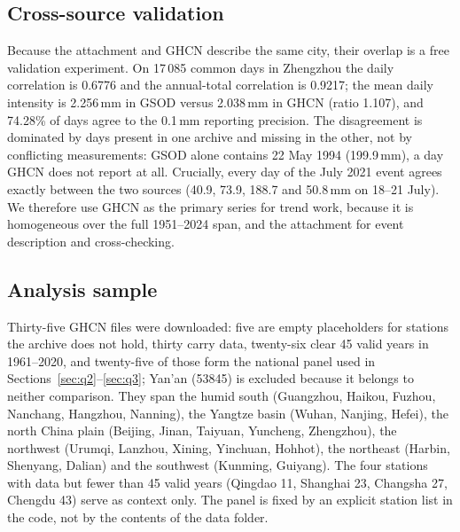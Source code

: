 \subsection{Cross-source validation}

Because the attachment and GHCN describe the same city, their overlap is a free validation experiment. On 17\,085 common days in Zhengzhou the daily correlation is 0.6776 and the annual-total correlation is 0.9217; the mean daily intensity is 2.256\,mm in GSOD versus 2.038\,mm in GHCN (ratio 1.107), and 74.28\% of days agree to the 0.1\,mm reporting precision. The disagreement is dominated by days present in one archive and missing in the other, not by conflicting measurements: GSOD alone contains 22 May 1994 (199.9\,mm), a day GHCN does not report at all. Crucially, every day of the July 2021 event agrees exactly between the two sources (40.9, 73.9, 188.7 and 50.8\,mm on 18--21 July). We therefore use GHCN as the primary series for trend work, because it is homogeneous over the full 1951--2024 span, and the attachment for event description and cross-checking.

\subsection{Analysis sample}

Thirty-five GHCN files were downloaded: five are empty placeholders for stations the archive does not hold, thirty carry data, twenty-six clear 45 valid years in 1961--2020, and twenty-five of those form the national panel used in Sections~\ref{sec:q2}--\ref{sec:q3}; Yan'an (53845) is excluded because it belongs to neither comparison. They span the humid south (Guangzhou, Haikou, Fuzhou, Nanchang, Hangzhou, Nanning), the Yangtze basin (Wuhan, Nanjing, Hefei), the north China plain (Beijing, Jinan, Taiyuan, Yuncheng, Zhengzhou), the northwest (Urumqi, Lanzhou, Xining, Yinchuan, Hohhot), the northeast (Harbin, Shenyang, Dalian) and the southwest (Kunming, Guiyang). The four stations with data but fewer than 45 valid years (Qingdao 11, Shanghai 23, Changsha 27, Chengdu 43) serve as context only. The panel is fixed by an explicit station list in the code, not by the contents of the data folder.